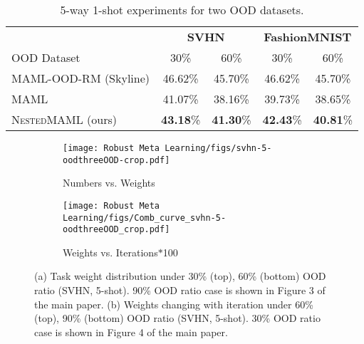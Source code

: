 \documentclass[letterpaper]{article} %
\newcommand{\sysname}{\textsc{NestedMAML}}
\begin{document}
\begin{table}[t!]
    \tiny  
    \centering
    \begin{center}
    \vspace{-3mm}
    \begin{tabular}{l | c c |c c }
        \toprule
         & \multicolumn{2}{c|}{\textbf{SVHN}} & \multicolumn{2}{c}{\textbf{FashionMNIST}}\\
        OOD Dataset  & 30\% & 60\%  & 30\% & 60\%  \\
        \midrule
        MAML-OOD-RM (Skyline)       & 46.62\% & 45.70\% & 46.62\%  & 45.70\% \\
        \midrule
        MAML              & 41.07\% & 38.16\% & 39.73\%  & 38.65\%  \\
        \hline
        \sysname{} (ours) & \textbf{43.18}\% & \textbf{41.30}\% & \textbf{42.43}\%  & \textbf{40.81}\% \\
        \bottomrule 
    \end{tabular}
\vspace{-3mm}
\end{center}
\vspace{-1mm}
\caption{\small 5-way 1-shot experiments for two OOD datasets.}
\label{tab:additonal_5w1s}
\end{table}


\begin{figure}[!t]
\vspace{-3mm}
    \centering
    \begin{subfigure}[b]{0.23\textwidth}
        \centering
        \texttt{[image: Robust Meta Learning/figs/svhn-5-oodthreeOOD-crop.pdf]}
        \caption{Numbers vs. Weights}
    \end{subfigure}
    \begin{subfigure}[b]{0.23\textwidth}
        \centering
        \texttt{[image: Robust Meta Learning/figs/Comb\_curve\_svhn-5-oodthreeOOD\_crop.pdf]}
        \caption{Weights vs. Iterations$*$100}
    \end{subfigure}
    \vspace{-3mm}
    \caption{\small (a) Task weight distribution under 30\% (top), 60\% (bottom) OOD ratio (SVHN, 5-shot). 90\% OOD ratio case is shown in Figure 3 of the main paper. (b) Weights changing with iteration under 60\% (top), 90\% (bottom) OOD ratio (SVHN, 5-shot). 30\% OOD ratio case is shown in Figure 4 of the main paper.}
    \label{fig:additional_weights_dist}
\vspace{-2mm}
\end{figure}
\vspace{-3mm}
\end{document}
